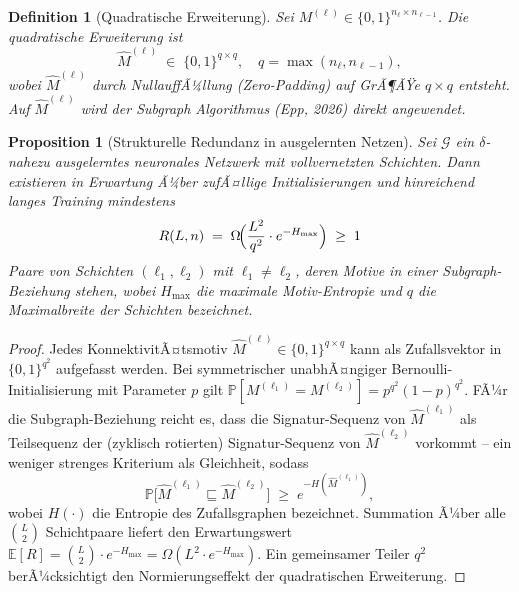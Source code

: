 ﻿\documentclass[12pt, a4paper, openany]{report}
\newtheorem{proposition}[theorem]{Proposition}
\newtheorem{definition}[theorem]{Definition}
\newcommand{\E}{\mathbb{E}}
\newcommand{\Prob}{\mathbb{P}}
\newcommand{\calG}{\mathcal{G}}
\begin{document}
\begin{definition}[Quadratische Erweiterung]
\label{def:square_motif}
Sei $M^{(\ell)} \in \{0,1\}^{n_\ell \times n_{\ell-1}}$.  Die
\emph{quadratische Erweiterung} ist
\[
  \hat{M}^{(\ell)} \;\in\; \{0,1\}^{q \times q},
  \quad q = \max(n_\ell, n_{\ell-1}),
\]
wobei $\hat{M}^{(\ell)}$ durch NullauffÃ¼llung (Zero-Padding) auf GrÃ¶ÃŸe
$q \times q$ entsteht.  Auf $\hat{M}^{(\ell)}$ wird der Subgraph Algorithmus
(Epp, 2026) direkt angewendet.
\end{definition}

\begin{proposition}[Strukturelle Redundanz in ausgelernten Netzen]
\label{prop:redundancy}
Sei $\calG$ ein $\delta$-nahezu ausgelerntes neuronales Netzwerk mit
vollvernetzten Schichten.  Dann existieren in Erwartung Ã¼ber zufÃ¤llige
Initialisierungen und hinreichend langes Training mindestens
\[
  R(L, n)
  \;=\;
  \Omega\!\Bigl(\frac{L^2}{q^2} \cdot e^{-H_{\max}}\Bigr)
  \;\geq\; 1
\]
Paare von Schichten $(\ell_1, \ell_2)$ mit $\ell_1 \neq \ell_2$, deren
Motive in einer Subgraph-Beziehung stehen, wobei $H_{\max}$ die maximale
Motiv-Entropie und $q$ die Maximalbreite der Schichten bezeichnet.
\end{proposition}

\begin{proof}
Jedes KonnektivitÃ¤tsmotiv $\hat{M}^{(\ell)} \in \{0,1\}^{q\times q}$ kann
als Zufallsvektor in $\{0,1\}^{q^2}$ aufgefasst werden.  Bei symmetrischer
unabhÃ¤ngiger Bernoulli-Initialisierung mit Parameter $p$ gilt
$\Prob[M^{(\ell_1)} = M^{(\ell_2)}] = p^{q^2}(1-p)^{q^2}$.  FÃ¼r die
Subgraph-Beziehung reicht es, dass die Signatur-Sequenz von $\hat{M}^{(\ell_1)}$
als Teilsequenz der (zyklisch rotierten) Signatur-Sequenz von $\hat{M}^{(\ell_2)}$
vorkommt -- ein weniger strenges Kriterium als Gleichheit, sodass
\[
  \Prob\!\bigl[\hat{M}^{(\ell_1)} \sqsubseteq \hat{M}^{(\ell_2)}\bigr]
  \;\geq\; e^{-H(\hat{M}^{(\ell_1)})},
\]
wobei $H(\cdot)$ die Entropie des Zufallsgraphen bezeichnet.
Summation Ã¼ber alle $\binom{L}{2}$ Schicht\-paare liefert den Erwartungswert
$\E[R] = \binom{L}{2} \cdot e^{-H_{\max}} = \Omega(L^2 \cdot e^{-H_{\max}})$.
Ein gemeinsamer Teiler $q^2$ berÃ¼cksichtigt den Normierungseffekt der
quadratischen Erweiterung.
\end{proof}

\end{document}
